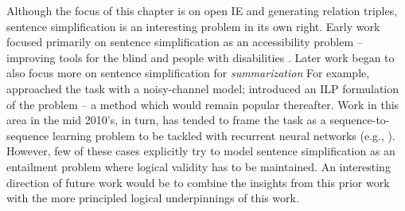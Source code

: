 Although the focus of this chapter is on open IE and generating relation triples,
  sentence simplification is an interesting problem in its own right.
Early work focused primarily on sentence simplification as an accessibility problem
  -- improving tools for the blind and people with disabilities 
  \cite{key:1998carroll-simplification,key:1998grefenstette-simplification}.
Later work began to also focus more on sentence simplification for
  \textit{summarization}
For example,  approached the task with
  a noisy-channel model;  introduced an
  ILP formulation of the problem -- a method which would remain popular thereafter.
Work in this area in the mid 2010's, in turn, has tended to frame the task as
  a sequence-to-sequence learning problem to be tackled with recurrent
  neural networks (e.g., ).
However, few of these cases explicitly try to model sentence simplification as
  an entailment problem where logical validity has to be maintained.
An interesting direction of future work would be to combine the insights from this
  prior work with the more principled logical underpinnings of this work.


%
%

